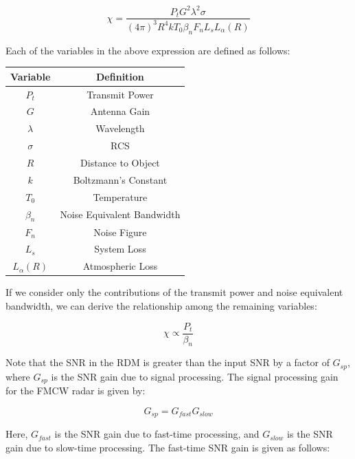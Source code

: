 \documentclass[conference]{IEEEtran}
\begin{document}
	\begin{equation}
		\chi = \frac{P_tG^2\lambda^2\sigma}{(4\pi)^3R^4kT_0\beta_nF_nL_sL_{\alpha}(R)}
	\end{equation}
	
	Each of the variables in the above expression are defined as follows:
	
	\begin{center}
	\begin{tabular}{|c|c|}
		\hline
		Variable & Definition \\
		\hline
		$P_t$ & Transmit Power \\
		\hline
		$G$ & Antenna Gain \\
		\hline
		$\lambda$ & Wavelength \\
		\hline
		$\sigma$ & RCS \\
		\hline
		$R$ & Distance to Object \\
		\hline
		$k$ & Boltzmann's Constant \\
		\hline
		$T_0$ & Temperature \\
		\hline
		$\beta_n$ & Noise Equivalent Bandwidth \\
		\hline
		$F_n$ & Noise Figure \\
		\hline
		$L_s$ & System Loss \\
		\hline
		$L_{\alpha}(R)$ & Atmospheric Loss \\
		\hline
	\end{tabular}
	\end{center}	
	
	If we consider only the contributions of the transmit power and noise equivalent bandwidth, we can derive the relationship among the remaining variables:
	
	\begin{equation}
		\chi \propto \frac{P_t}{\beta_n}
		\label{eq::snr_propto}
	\end{equation}
	
	Note that the SNR in the RDM is greater than the input SNR by a factor of $G_{sp}$, where $G_{sp}$ is the SNR gain due to signal processing. The signal processing gain for the FMCW radar is given by:
	
	\begin{equation}
		G_{sp} = G_{fast}G_{slow}
	\end{equation}
	
	Here, $G_{fast}$ is the SNR gain due to fast-time processing, and $G_{slow}$ is the SNR gain due to slow-time processing. The fast-time SNR gain is given as follows:
	
\end{document}
